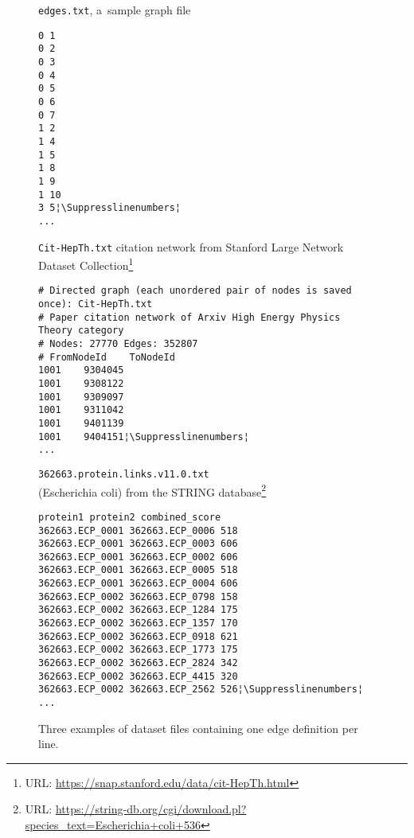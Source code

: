 \begin{savenotes}
\begin{figure}[!ht]
\caption{Three examples of dataset files containing one edge definition per line.}\label{fig:edge_file_examples}
\begin{minipage}[t]{.12\textwidth}
\raggedright\footnotesize \texttt{edges.txt}, a~sample graph file
\begin{lstlisting}
0 1
0 2
0 3
0 4
0 5
0 6
0 7
1 2
1 4
1 5
1 8
1 9
1 10
3 5¦\Suppresslinenumbers¦
...
\end{lstlisting}\Reactivatelinenumbers
\end{minipage}\hspace*{0.8cm}%
\begin{minipage}[t]{.36\textwidth}
\footnotesize \texttt{Cit-HepTh.txt} citation network from Stan\-ford Large Network Data\-set Col\-lec\-tion\footnote{URL: \url{https://snap.stanford.edu/data/cit-HepTh.html}}
\begin{lstlisting}
# Directed graph (each unordered pair of nodes is saved once): Cit-HepTh.txt
# Paper citation network of Arxiv High Energy Physics Theory category
# Nodes: 27770 Edges: 352807
# FromNodeId	ToNodeId
1001	9304045
1001	9308122
1001	9309097
1001	9311042
1001	9401139
1001	9404151¦\Suppresslinenumbers¦
...
\end{lstlisting}\Reactivatelinenumbers
\end{minipage}\hspace*{0.8cm}%
\begin{minipage}[t]{0.41\textwidth}
\footnotesize \texttt{362663.protein.links.v11.0.txt} \\(Escherichia coli) from the STRING data\-base\footnote{URL: \url{https://string-db.org/cgi/download.pl?species_text=Escherichia+coli+536}}
\begin{lstlisting}
protein1 protein2 combined_score
362663.ECP_0001 362663.ECP_0006 518
362663.ECP_0001 362663.ECP_0003 606
362663.ECP_0001 362663.ECP_0002 606
362663.ECP_0001 362663.ECP_0005 518
362663.ECP_0001 362663.ECP_0004 606
362663.ECP_0002 362663.ECP_0798 158
362663.ECP_0002 362663.ECP_1284 175
362663.ECP_0002 362663.ECP_1357 170
362663.ECP_0002 362663.ECP_0918 621
362663.ECP_0002 362663.ECP_1773 175
362663.ECP_0002 362663.ECP_2824 342
362663.ECP_0002 362663.ECP_4415 320
362663.ECP_0002 362663.ECP_2562 526¦\Suppresslinenumbers¦
...
\end{lstlisting}\Reactivatelinenumbers
\end{minipage}%
\hspace*{-0.5cm}
\end{figure}
\end{savenotes}

